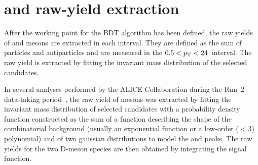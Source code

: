 \begin{table}[b!]
    \centering
    \caption{Selection criteria applied to enhance the significance of the $\ds$ meson contribution in the $\pt$ bins of the analysis.}
    \label{tab:working_point}
    \vspace*{0.3cm}
\end{table}

\section{\texorpdfstring{\ds and \dpl raw-yield extraction}{Ds+ and D+ raw-yield extraction}}

After the working point for the BDT algorithm has been defined, the raw yields of \ds and \dpl mesons are extracted in each \pt interval. They are defined as the sum of particles and antiparticles and are measured in the $0.5<p_\mathrm{T}<24$~\gevc interval. The raw yield is extracted by fitting the invariant mass distribution of the selected candidates. 

In several analyses performed by the ALICE Collaboration during the Run~2 data-taking period~\cite{ALICE:2021mgk,ALICE:2023sgl,ALICE:2021kfc}, the raw yield of \ds mesons was extracted by fitting the invariant mass distribution of selected candidates with a probability density function constructed as the sum of a function describing the shape of the combinatorial background (usually an exponential function or a low-order ($<3$) polynomial) and of two gaussian distributions to model the \ds and \dpl peaks. The raw yields for the two D-meson species are then obtained by integrating the signal function. 

